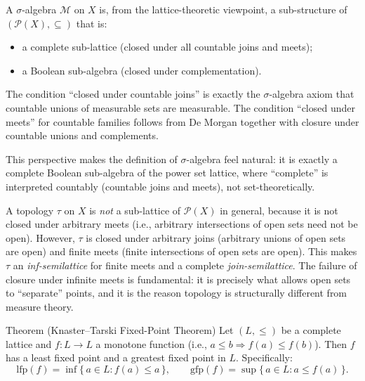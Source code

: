 \begin{remark*}
\label{rem:sigma-alg-lattice}
A $\sigma$-algebra $\mathcal{M}$ on $X$ is, from the lattice-theoretic
viewpoint, a sub-structure of $(\mathcal{P}(X), \subseteq)$ that is:
\begin{itemize}
  \item a complete sub-lattice (closed under all countable joins and meets);
  \item a Boolean sub-algebra (closed under complementation).
\end{itemize}
The condition ``closed under countable joins'' is exactly the $\sigma$-algebra
axiom that countable unions of measurable sets are measurable.  The condition
``closed under meets'' for countable families follows from De Morgan together
with closure under countable unions and complements.

This perspective makes the definition of $\sigma$-algebra feel natural: it is
exactly a complete Boolean sub-algebra of the power set lattice, where
``complete'' is interpreted countably (countable joins and meets), not
set-theoretically.
\end{remark*}

\begin{remark*}
\label{rem:topology-lattice}
A topology $\tau$ on $X$ is \emph{not} a sub-lattice of $\mathcal{P}(X)$ in
general, because it is not closed under arbitrary meets (i.e., arbitrary
intersections of open sets need not be open).  However, $\tau$ is closed under
arbitrary joins (arbitrary unions of open sets are open) and finite meets
(finite intersections of open sets are open).  This makes $\tau$ an
\emph{inf-semilattice} for finite meets and a complete \emph{join-semilattice}.
The failure of closure under infinite meets is fundamental: it is precisely
what allows open sets to ``separate'' points, and it is the reason topology
is structurally different from measure theory.
\end{remark*}


\begin{theorembox}{Theorem (Knaster--Tarski Fixed-Point Theorem)}
\label{thm:knaster-tarski}
Let $(L, \leq)$ be a complete lattice and $f : L \to L$ a monotone
function (i.e., $a \leq b \Rightarrow f(a) \leq f(b)$).  Then $f$ has a
least fixed point and a greatest fixed point in $L$.  Specifically:
\[
  \mathrm{lfp}(f) = \inf\{\, a \in L : f(a) \leq a \,\},
  \qquad
  \mathrm{gfp}(f) = \sup\{\, a \in L : a \leq f(a) \,\}.
\]
\end{theorembox}


